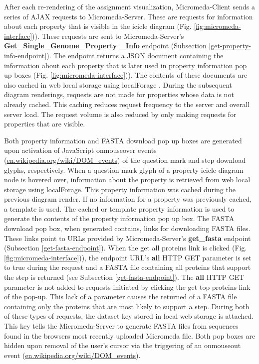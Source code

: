After each re-rendering of the assignment visualization, Micromeda-Client sends a series of AJAX requests to Micromeda-Server. These are requests for information about each property that is visible in the icicle diagram (Fig. \ref{fig:micromeda-interface})). These requests are sent to Micromeda-Server's \textbf{Get\_Single\_Genome\_Property \_Info} endpoint (Subsection \ref{get-property-info-endpoint}). The endpoint returns a JSON document containing the information about each property that is later used in property information pop up boxes (Fig. \ref{fig:micromeda-interface})). The contents of these documents are also cached in web local storage using localForage \cite{localforage}. During the subsequent diagram renderings, requests are not made for properties whose data is not already cached. This caching reduces request frequency to the server and overall server load. The request volume is also reduced by only making requests for properties that are visible.

Both property information and FASTA download pop up boxes are generated upon activation of JavaScript onmouseover events \cite{dom-events} (\href{en.wikipedia.org/wiki/DOM\_events}{en.wikipedia.org/wiki/DOM\_events}) of the question mark and step download glyphs, respectively. When a question mark glyph of a property icicle diagram node is hovered over, information about the property is retrieved from web local storage using localForage. This property information was cached during the previous diagram render. If no information for a property was previously cached, a template is used. The cached or template property information is used to generate the contents of the property information pop up box. The FASTA download pop box, when generated contains, links for downloading FASTA files. These links point to URLs provided by Micromeda-Server's \textbf{get\_fasta} endpoint (Subsection \ref{get-fasta-endpoint}). When the get all proteins link is clicked (Fig. \ref{fig:micromeda-interface})), the endpoint URL's \textbf{all} HTTP GET parameter is set to true during the request and a FASTA file containing all proteins that support the step is returned (see Subsection \ref{get-fasta-endpoint}). The \textbf{all} HTTP GET parameter is not added to requests initiated by clicking the get top proteins link of the pop-up. This lack of a parameter causes the returned of a FASTA file containing only the proteins that are most likely to support a step. During both of these types of requests, the dataset key stored in local web storage is attached. This key tells the Micromeda-Server to generate FASTA files from sequences found in the browsers most recently uploaded Micromeda file. Both pop boxes are hidden upon removal of the user's cursor via the triggering of an onmouseout event \cite{dom-events} (\href{en.wikipedia.org/wiki/DOM\_events}{en.wikipedia.org/wiki/DOM\_events}).


